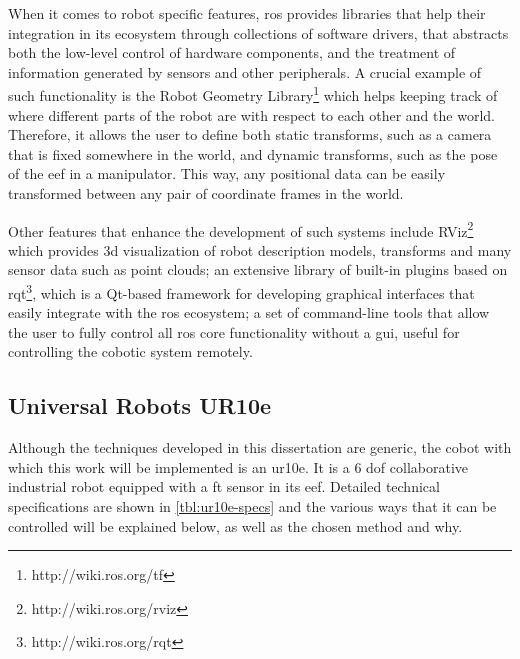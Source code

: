 \par When it comes to robot specific features, \ac{ros} provides libraries that help their integration  in its ecosystem through collections of software drivers, that abstracts both the low-level control of hardware components, and the treatment of information generated by sensors and other peripherals. A crucial example of such functionality is the Robot Geometry Library\footnote{http://wiki.ros.org/tf} which helps keeping track of where different parts of the robot are with respect to each other and the world. Therefore, it allows the user to define both static transforms, such as a camera that is fixed somewhere in the world, and dynamic transforms, such as the pose of the \ac{eef} in a manipulator. This way, any positional data can be easily transformed between any pair of coordinate frames in the world.
\par Other features that enhance the development of such systems include RViz\footnote{http://wiki.ros.org/rviz} which provides \acs{3d} visualization of robot description models, transforms and many sensor data such as point clouds; an extensive library of built-in plugins based on rqt\footnote{http://wiki.ros.org/rqt}, which is a Qt-based framework for developing graphical interfaces that easily integrate with the \ac{ros} ecosystem; a set of command-line tools that allow the user to fully control all \ac{ros} core functionality without a \ac{gui}, useful for controlling the cobotic system remotely.

\subsection{Universal Robots UR10e}

\par Although the techniques developed in this dissertation are generic, the cobot with which this work will be implemented is an \ac{ur10e}. It is a 6 \ac{dof} collaborative industrial robot equipped with a \ac{ft} sensor in its \ac{eef}. Detailed technical specifications are shown in \autoref{tbl:ur10e-specs} and the various ways that it can be controlled will be explained below, as well as the chosen method and why.

